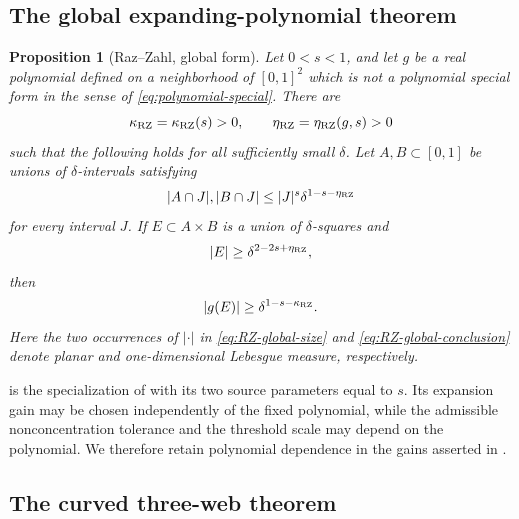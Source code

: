 \documentclass[11pt]{article}
\newtheorem{proposition}[theorem]{Proposition}
\begin{document}
\subsection{The global expanding-polynomial theorem}

\begin{proposition}[Raz--Zahl, global form]
\label{prop:RZ-global}
Let \(0<s<1\), and let \(g\) be a real polynomial defined on a
neighborhood of \([0,1]^2\) which is not a polynomial special form
in the sense of \eqref{eq:polynomial-special}.  There are
\[
 \kappa_{\rm RZ}=\kappa_{\rm RZ}(s)>0,
 \qquad
 \eta_{\rm RZ}=\eta_{\rm RZ}(g,s)>0
\]
such that the following holds for all sufficiently small \(\delta\).
Let \(A,B\subset[0,1]\) be unions of \(\delta\)-intervals satisfying
\begin{equation}
 |A\cap J|,|B\cap J|
 \le |J|^s\delta^{1-s-\eta_{\rm RZ}}
 \label{eq:RZ-global-NC}
\end{equation}
for every interval \(J\).  If
\(E\subset A\times B\) is a union of \(\delta\)-squares and
\begin{equation}
 |E|\ge\delta^{2-2s+\eta_{\rm RZ}},
 \label{eq:RZ-global-size}
\end{equation}
then
\begin{equation}
 |g(E)|\ge\delta^{1-s-\kappa_{\rm RZ}}.
 \label{eq:RZ-global-conclusion}
\end{equation}
Here the two occurrences of \(|\cdot|\) in
\eqref{eq:RZ-global-size} and \eqref{eq:RZ-global-conclusion} denote
planar and one-dimensional Lebesgue measure, respectively.
\end{proposition}

 is the specialization of
\cite[Theorem~1.18]{RZ} with its two source parameters equal to
\(s\).  Its expansion gain may be chosen independently of the fixed
polynomial, while the admissible nonconcentration tolerance and the
threshold scale may depend on the polynomial.  We therefore retain
polynomial dependence in the gains asserted in .

\subsection{The curved three-web theorem}
\end{document}
